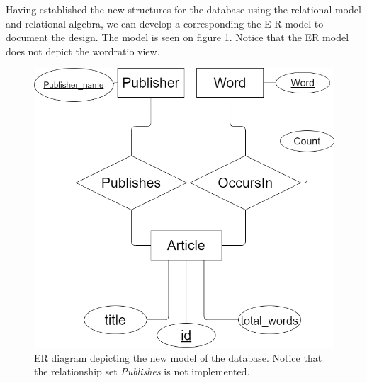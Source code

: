 Having established the new structures for the database using the relational model and relational algebra, we can develop a corresponding the E-R model to document the design. 
The model is seen on figure \ref{fig:newdatabaseRedesignER}. Notice that the ER model does not depict the wordratio view.

\begin{figure}[H]
    \centering
    \includegraphics[scale=0.35]{Images/new ER.drawio.png}
    \caption{ER diagram depicting the new model of the database. Notice that the relationship set \textit{Publishes} is not implemented.}
    \label{fig:newdatabaseRedesignER}
\end{figure}